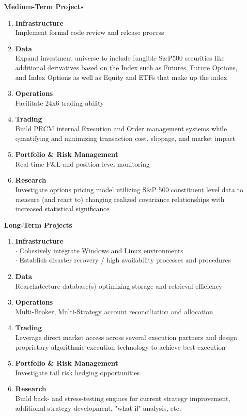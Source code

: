 \documentclass[6pt]{article}
\begin{document}
\textbf{\Large{Medium-Term Projects}} \\
\begin{enumerate}
  \item \textbf{Infrastructure} \\
    Implement formal code review and release process
  \item \textbf{Data} \\
    Expand investment universe to include fungible S\&P500 securities like
    additional derivatives based on the Index such as Futures, Future Options,
    and Index Options as well as Equity and ETFs that make up the index
  \item \textbf{Operations} \\
    Facilitate 24x6 trading ability
  \item \textbf{Trading} \\
    Build PRCM internal Execution and Order management systems while quantifying
    and minimizing transaction cost, slippage, and market impact
  \item \textbf{Portfolio \& Risk Management} \\
    Real-time P\&L and position level monitoring
  \item \textbf{Research} \\
    Investigate options pricing model utilizing S\&P 500 constituent level data
    to measure (and react to) changing realized covariance relationships with
    increased statistical significance
\end{enumerate}

\vspace{0.1in}

\textbf{\Large{Long-Term Projects}} \\
\begin{enumerate}
  \item \textbf{Infrastructure} \\
    $\cdot$ Cohesively integrate  Windows and Linux environments \\
    $\cdot$ Establish disaster recovery / high availability processes
      and procedures \\
  \item \textbf{Data} \\
    Rearchatecture database(s) optimizing storage and retrieval efficiency
  \item \textbf{Operations} \\
    Multi-Broker, Multi-Strategy account reconciliation and allocation
  \item \textbf{Trading} \\
    Leverage direct market access across several execution partners and design
    proprietary algorithmic execution technology to achieve best execution \\
  \item \textbf{Portfolio \& Risk Management} \\
    Investigate tail risk hedging opportunities
  \item \textbf{Research} \\
    Build back- and stress-testing engines for current strategy improvement,
    additional strategy development, "what if" analysis, etc. \\
\end{enumerate}
\end{document}
